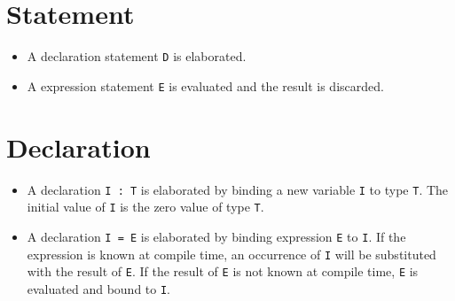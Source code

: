 
\section{Statement}
\begin{itemize}
\item A declaration statement \texttt{D} is elaborated.
\item A expression statement \texttt{E} is evaluated and the result is discarded.
\end{itemize}

\section{Declaration}
\begin{itemize}
\item A declaration \texttt{I : T} is elaborated by binding a new variable \texttt{I} to type \texttt{T}. The initial value of \texttt{I} is the zero value of type \texttt{T}.
\item A declaration \texttt{I = E} is elaborated by binding expression \texttt{E} to \texttt{I}. If the expression is known at compile time, an occurrence of \texttt{I} will be substituted with the result of \texttt{E}. If the 
result of \texttt{E} is not known at compile time, \texttt{E} is evaluated and bound to \texttt{I}.
\end{itemize}

